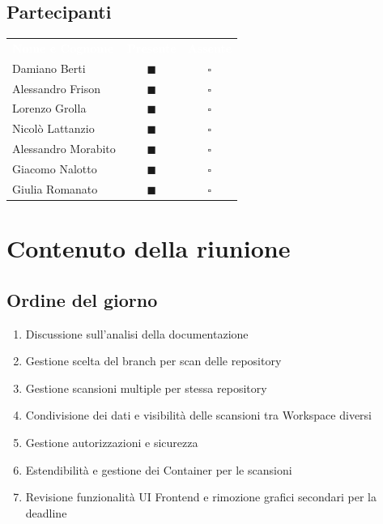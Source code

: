 \documentclass[a4paper, 11pt]{article}
\begin{document}
\subsection{Partecipanti}
\begin{center}
    \begin{tabular}{>{\raggedright\arraybackslash}p{6cm} c c}
        \rowcolor{AccentColor}
        \textcolor{white}{\textbf{Nome e Cognome}} & 
        \textcolor{white}{\textbf{Presente}} & 
        \textcolor{white}{\textbf{Assente}} \\
        
        Damiano Berti     & \textcolor{AccentColor}{$\blacksquare$}    & $\square$        \\
        Alessandro Frison     & \textcolor{AccentColor}{$\blacksquare$}    & $\square$        \\
        Lorenzo Grolla     & \textcolor{AccentColor}{$\blacksquare$}    & $\square$        \\
        Nicolò Lattanzio    & \textcolor{AccentColor}{$\blacksquare$}    & $\square$        \\
        Alessandro Morabito   & \textcolor{AccentColor}{$\blacksquare$}    & $\square$        \\
        Giacomo Nalotto   & \textcolor{AccentColor}{$\blacksquare$}    & $\square$        \\
        Giulia Romanato   & \textcolor{AccentColor}{$\blacksquare$}    & $\square$        \\
    \end{tabular}
\end{center}

\section{Contenuto della riunione}

\subsection{Ordine del giorno}
\begin{enumerate}
    \item Discussione sull'analisi della documentazione
    \item Gestione scelta del branch per scan delle repository
    \item Gestione scansioni multiple per stessa repository
    \item Condivisione dei dati e visibilità delle scansioni tra Workspace diversi
    \item Gestione autorizzazioni e sicurezza
    \item Estendibilità e gestione dei Container per le scansioni
    \item Revisione funzionalità UI Frontend e rimozione grafici secondari per la deadline
\end{enumerate}
\end{document}
